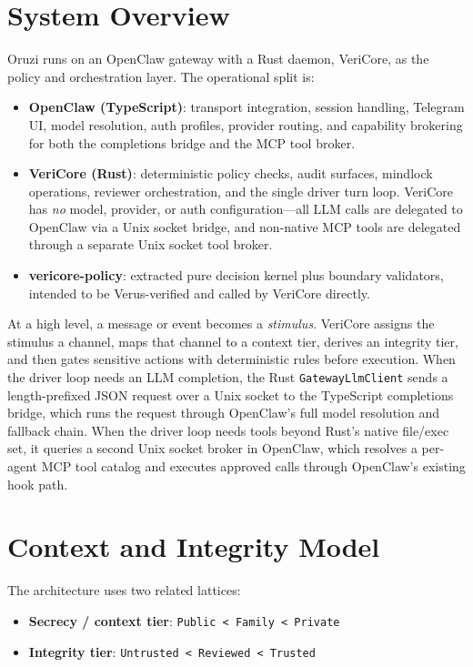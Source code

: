 \documentclass[11pt]{article}
\begin{document}
\section{System Overview}
Oruzi runs on an OpenClaw gateway with a Rust daemon, VeriCore, as the policy and orchestration layer. The operational split is:
\begin{itemize}[leftmargin=1.5em]
\item \textbf{OpenClaw (TypeScript)}: transport integration, session handling, Telegram UI, model resolution, auth profiles, provider routing, and capability brokering for both the completions bridge and the MCP tool broker.
\item \textbf{VeriCore (Rust)}: deterministic policy checks, audit surfaces, mindlock operations, reviewer orchestration, and the single driver turn loop. VeriCore has \emph{no} model, provider, or auth configuration---all LLM calls are delegated to OpenClaw via a Unix socket bridge, and non-native MCP tools are delegated through a separate Unix socket tool broker.
\item \textbf{vericore-policy}: extracted pure decision kernel plus boundary validators, intended to be Verus-verified and called by VeriCore directly.
\end{itemize}

At a high level, a message or event becomes a \emph{stimulus}. VeriCore assigns the stimulus a channel, maps that channel to a context tier, derives an integrity tier, and then gates sensitive actions with deterministic rules before execution. When the driver loop needs an LLM completion, the Rust \texttt{GatewayLlmClient} sends a length-prefixed JSON request over a Unix socket to the TypeScript completions bridge, which runs the request through OpenClaw's full model resolution and fallback chain. When the driver loop needs tools beyond Rust's native file/exec set, it queries a second Unix socket broker in OpenClaw, which resolves a per-agent MCP tool catalog and executes approved calls through OpenClaw's existing hook path.

\section{Context and Integrity Model}
The architecture uses two related lattices:
\begin{itemize}[leftmargin=1.5em]
\item \textbf{Secrecy / context tier}: \texttt{Public < Family < Private}
\item \textbf{Integrity tier}: \texttt{Untrusted < Reviewed < Trusted}
\end{itemize}
\end{document}
